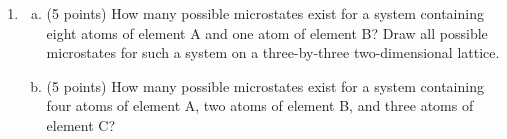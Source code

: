 
\DeclareSIUnit{}





\pagebreak

\begin{enumerate}
  \item
    \begin{enumerate}[a.]
      \item (5 points) How many possible microstates exist for a
        system containing eight atoms of element
        A and one atom of element B? Draw all possible microstates
        for such a system on a three-by-three
        two-dimensional lattice.


      \item (5 points) How many possible microstates exist for a
        system containing four atoms of element A,
        two atoms of element B, and three atoms of element C?


\end{enumerate}
\end{enumerate}
